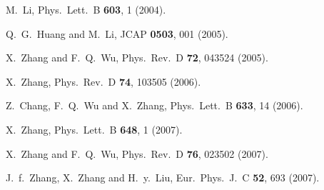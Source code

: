 \documentclass[aps,prd,nofootinbib,amsmath,amssymb,twocolumn,superscriptaddress,10pt]{revtex4}%
\begin{document}
\begin{thebibliography}{}
  M.~Li,
  Phys.\ Lett.\ B {\bf 603}, 1 (2004).

Q.~G.~Huang and M.~Li,
  JCAP {\bf 0503}, 001 (2005).


  X.~Zhang and F.~Q.~Wu,
  Phys.\ Rev.\ D {\bf 72}, 043524 (2005).


  X.~Zhang,
  Phys.\ Rev.\ D {\bf 74}, 103505 (2006).

  Z.~Chang, F.~Q.~Wu and X.~Zhang,
  Phys.\ Lett.\ B {\bf 633}, 14 (2006).

  X.~Zhang,
  Phys.\ Lett.\ B {\bf 648}, 1 (2007).

  X.~Zhang and F.~Q.~Wu,
  Phys.\ Rev.\ D {\bf 76}, 023502 (2007).


  J.~f.~Zhang, X.~Zhang and H.~y.~Liu,
  Eur.\ Phys.\ J.\ C {\bf 52}, 693 (2007).


\end{thebibliography}
\end{document}
